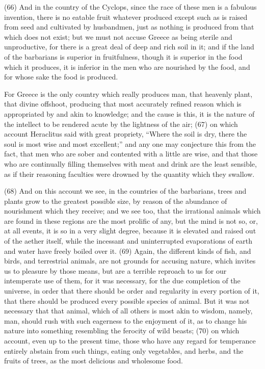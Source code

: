 (66) And in the country of the Cyclops, since the race of these men is a fabulous invention, there is
no eatable fruit whatever produced except such as is raised from seed and cultivated by
husbandmen, just as nothing is produced from that which does not exist; but we must not accuse
Greece as being sterile and unproductive, for there is a great deal of deep and rich soil in it; and if
the land of the barbarians is superior in fruitfulness, though it is superior in the food which it
produces, it is inferior in the men who are nourished by the food, and for whose sake the food is
produced.

For Greece is the only country which really produces man, that heavenly plant, that divine offshoot,
producing that most accurately refined reason which is appropriated by and akin to knowledge; and
the cause is this, it is the nature of the intellect to be rendered acute by the lightness of the air; (67)
on which account Heraclitus said with great propriety, ``Where the soil is dry, there the soul is most
wise and most excellent;'' and any one may conjecture this from the fact, that men who are sober
and contented with a little are wise, and that those who are continually filling themselves with meat
and drink are the least sensible, as if their reasoning faculties were drowned by the quantity which
they swallow.

(68) And on this account we see, in the countries of the barbarians, trees and plants grow to the
greatest possible size, by reason of the abundance of nourishment which they receive; and we see
too, that the irrational animals which are found in these regions are the most prolific of any, but the
mind is not so, or, at all events, it is so in a very slight degree, because it is elevated and raised out
of the aether itself, while the incessant and uninterrupted evaporations of earth and water have
freely boiled over it. (69) Again, the different kinds of fish, and birds, and terrestrial animals, are
not grounds for accusing nature, which invites us to pleasure by those means, but are a terrible
reproach to us for our intemperate use of them, for it was necessary, for the due completion of the
universe, in order that there should be order and regularity in every portion of it, that there should
be produced every possible species of animal. But it was not necessary that that animal, which of
all others is most akin to wisdom, namely, man, should rush with such eagerness to the enjoyment
of it, as to change his nature into something resembling the ferocity of wild beasts; (70) on which
account, even up to the present time, those who have any regard for temperance entirely abstain
from such things, eating only vegetables, and herbs, and the fruits of trees, as the most delicious
and wholesome food.

